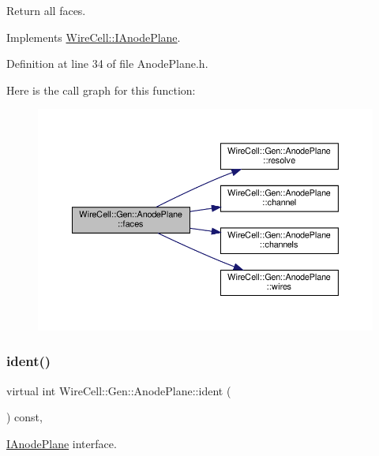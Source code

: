 Return all faces. 



Implements \hyperlink{class_wire_cell_1_1_i_anode_plane_a22ebdffd5613bf8007e0ae314984c36a}{Wire\+Cell\+::\+I\+Anode\+Plane}.



Definition at line 34 of file Anode\+Plane.\+h.

Here is the call graph for this function\+:
\nopagebreak
\begin{figure}[H]
\begin{center}
\leavevmode
\includegraphics[width=350pt]{class_wire_cell_1_1_gen_1_1_anode_plane_ad25ce7beb274de6570cbb104a1a67702_cgraph}
\end{center}
\end{figure}
\mbox{\label{class_wire_cell_1_1_gen_1_1_anode_plane_afe12d9d6f826b42e66d9ab9da7799dae}} 
\subsubsection{\texorpdfstring{ident()}{ident()}}
{\footnotesize\ttfamily virtual int Wire\+Cell\+::\+Gen\+::\+Anode\+Plane\+::ident (\begin{DoxyParamCaption}{ }\end{DoxyParamCaption}) const\hspace{0.3cm}{\ttfamily [inline]}, {\ttfamily [virtual]}}



\hyperlink{class_wire_cell_1_1_i_anode_plane}{I\+Anode\+Plane} interface. 



